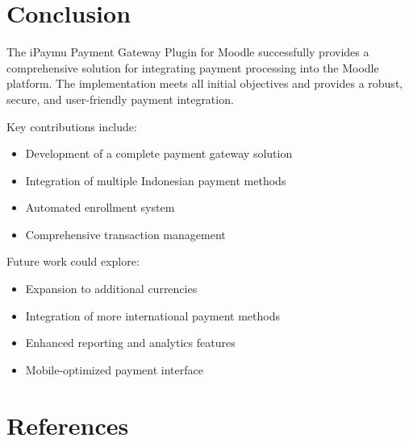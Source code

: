 \documentclass{article} %
\begin{document}
\section{Conclusion}
    The iPaymu Payment Gateway Plugin for Moodle successfully provides a comprehensive solution for integrating payment processing into the Moodle platform. The implementation meets all initial objectives and provides a robust, secure, and user-friendly payment integration.

    Key contributions include:
    \begin{itemize}
        \item Development of a complete payment gateway solution
        \item Integration of multiple Indonesian payment methods
        \item Automated enrollment system
        \item Comprehensive transaction management
    \end{itemize}

    Future work could explore:
    \begin{itemize}
        \item Expansion to additional currencies
        \item Integration of more international payment methods
        \item Enhanced reporting and analytics features
        \item Mobile-optimized payment interface
    \end{itemize}

\section*{References}
    \printbibliography %


\appendix
\end{document}
